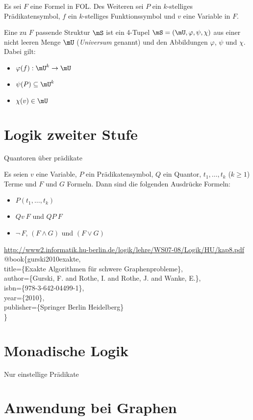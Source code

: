 \begin{mydef}[Struktur]
    Es sei $F$ eine Formel in FOL. Des Weiteren sei $P$ ein $k$-stelliges Prädikatensymbol, $f$ ein $k$-stelliges Funktionssymbol und $v$ eine Variable in $F$.
    
    Eine zu $F$ passende Struktur $\mS$ ist ein 4-Tupel $\mS=(\mU,\varphi,\psi,\chi)$ aus einer nicht leeren Menge $\mU$ (\emph{Universum}  genannt) und den Abbildungen $\varphi$, $\psi$ und $\chi$. Dabei gilt:
    \begin{itemize}
        \item  $\varphi(f):\mU^k\rightarrow\mU$
        \item  $\psi(P)\subseteq\mU^k$
        \item  $\chi(v)\in\mU$
    \end{itemize}
\end{mydef}

\section{Logik zweiter Stufe}
Quantoren über prädikate

\begin{mydef}
    Es seien $v$ eine Variable, $P$ ein Prädikatensymbol, $Q$ ein Quantor, $t_1,\ldots,t_k$ ($k\geq 1$) Terme und $F$ und $G$ Formeln. Dann sind die folgenden Ausdrücke Formeln:
    \begin{itemize}
       \item  $P(t_1,\ldots,t_k)$
       \item  $Qv\ F$ und $QP\ F$
       \item  $\lnot\,F$, $(F\land G)$ und $(F\lor G)$
    \end{itemize}
\end{mydef}

\url{http://www2.informatik.hu-berlin.de/logik/lehre/WS07-08/Logik/HU/kap8.pdf}
@book\{gurski2010exakte,\\
  title=\{Exakte Algorithmen für schwere Graphenprobleme\},\\
  author=\{Gurski, F. and Rothe, I. and Rothe, J. and Wanke, E.\},\\
  isbn=\{978-3-642-04499-1\},\\
  year=\{2010\},\\
  publisher=\{Springer Berlin Heidelberg\}\\
\}

\section{Monadische Logik}
Nur einstellige Prädikate

\section{Anwendung bei Graphen}